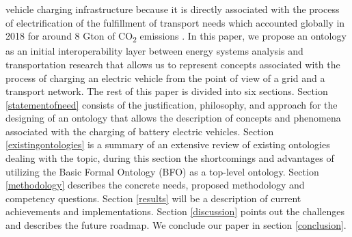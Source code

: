 vehicle charging infrastructure because it is directly associated with the
process of electrification of the fulfillment of transport needs which accounted
globally in 2018 for around 8 Gton of CO\textsubscript{2} emissions
\cite{IEA.2023}. In this paper, we propose an ontology as an initial
interoperability layer between energy systems analysis and transportation
research that allows us to represent concepts associated with the process of
charging an electric vehicle from the point of view of a grid and a transport
network. The rest of this paper is divided into six sections. Section
\ref{statementofneed} consists of the justification, philosophy, and approach for
the designing of an ontology that allows the description of concepts and
phenomena associated with the charging of battery electric vehicles. Section
\ref{existingontologies} is a summary of an extensive review of existing
ontologies dealing with the topic, during this section the shortcomings and
advantages of utilizing the Basic Formal Ontology (BFO) \cite{Arp.2015} as a
top-level ontology. Section \ref{methodology} describes the concrete needs,
proposed methodology and competency questions. Section \ref{results} will be a
description of current achievements and implementations. Section
\ref{discussion} points out the challenges and describes the future roadmap. We
conclude our paper in section \ref{conclusion}.

